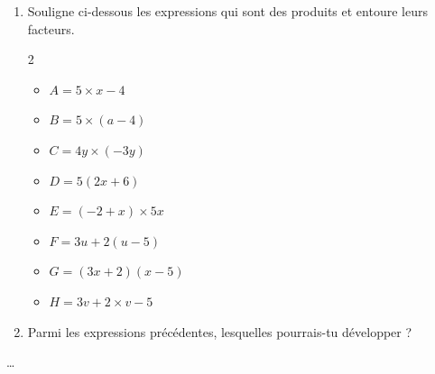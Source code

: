 \begin{exercice*}
    \begin{enumerate}
        \item Souligne ci-dessous les expressions qui sont des produits et entoure leurs facteurs.
              \begin{multicols}{2}
                  \begin{itemize}
                      \item[] $A = 5 \times x - 4$
                      \item[] $B = 5 \times (a - 4)$
                      \item[] $C = 4y \times (-3y)$
                      \item[] $D = 5(2x + 6)$
                      \item[] $E = (-2 + x) \times 5x$
                      \item[] $F = 3u + 2(u - 5)$
                      \item[] $G = (3x + 2)(x - 5)$
                      \item[] $H = 3v + 2 \times v - 5$
                  \end{itemize}
              \end{multicols}
        \item Parmi les expressions précédentes, lesquelles pourrais-tu développer ?
    \end{enumerate}
\end{exercice*}
\begin{corrige}
    \dots
\end{corrige}

